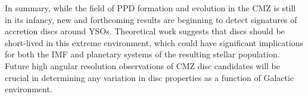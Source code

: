 In summary, while the field of PPD formation and evolution in the CMZ is still in its infancy, new and forthcoming results are beginning to detect signatures of accretion discs around YSOs. Theoretical work suggests that discs should be short-lived in this extreme environment, which could have significant implications for both the IMF and planetary systems of the resulting stellar population. Future high angular resolution observations of CMZ disc candidates will be crucial in determining any variation in disc properties as a function of Galactic environment.
